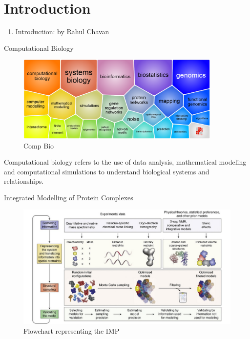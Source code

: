 \section*{Introduction}

\begin{frame}
    \begin{enumerate}
        \item Introduction: by Rahul Chavan
    \end{enumerate}
    
\end{frame}

\begin{frame}{Computational Biology}

    \begin{figure}
        \centering
        \includegraphics[width=0.9\textwidth]{images/bioinf.png}
        \caption{Comp Bio}
    \end{figure}

    Computational biology refers to the use of data analysis, mathematical modeling and computational simulations to understand biological systems and relationships.


\end{frame}

\begin{frame}{Integrated Modelling of Protein Complexes}
    \begin{figure}
        \centering
        \includegraphics[width=1\textwidth]{images/imp.png}
        \caption{Flowchart representing the IMP}
        \label{fig:my_label}
    \end{figure}
\end{frame}

